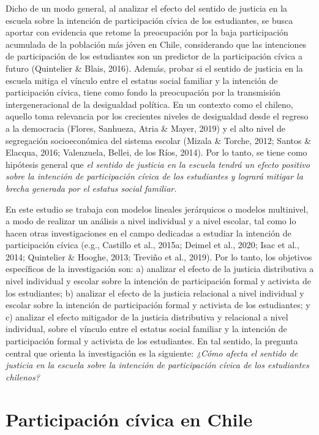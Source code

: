 \documentclass[12pt,twoside]{templates/facsothesis}
\begin{document}
Dicho de un modo general, al analizar el efecto del sentido de justicia en la escuela sobre la intención de participación cívica de los estudiantes, se busca aportar con evidencia que retome la preocupación por la baja participación acumulada de la población más jóven en Chile, considerando que las intenciones de participación de los estudiantes son un predictor de la participación cívica a futuro (Quintelier \& Blais, 2016). Además, probar si el sentido de justicia en la escuela mitiga el vínculo entre el estatus social familiar y la intención de participación cívica, tiene como fondo la preocupación por la transmisión intergeneracional de la desigualdad política. En un contexto como el chileno, aquello toma relevancia por los crecientes niveles de desigualdad desde el regreso a la democracia (Flores, Sanhueza, Atria \& Mayer, 2019) y el alto nivel de segregación socioeconómica del sistema escolar (Mizala \& Torche, 2012; Santos \& Elacqua, 2016; Valenzuela, Bellei, de los Ríos, 2014). Por lo tanto, se tiene como hipótesis general que \emph{el sentido de justicia en la escuela tendrá un efecto positivo sobre la intención de participación cívica de los estudiantes y logrará mitigar la brecha generada por el estatus social familiar.}

En este estudio se trabaja con modelos lineales jerárquicos o modelos multinivel, a modo de realizar un análisis a nivel individual y a nivel escolar, tal como lo hacen otras investigaciones en el campo dedicadas a estudiar la intención de participación cívica (e.g., Castillo et al., 2015a; Deimel et al., 2020; Isac et al., 2014; Quintelier \& Hooghe, 2013; Treviño et al., 2019). Por lo tanto, los objetivos específicos de la investigación son: a) analizar el efecto de la justicia distributiva a nivel individual y escolar sobre la intención de participación formal y activista de los estudiantes; b) analizar el efecto de la justicia relacional a nivel individual y escolar sobre la intención de participación formal y activista de los estudiantes; y c) analizar el efecto mitigador de la justicia distributiva y relacional a nivel individual, sobre el vínculo entre el estatus social familiar y la intención de participación formal y activista de los estudiantes. En tal sentido, la pregunta central que orienta la investigación es la siguiente: \emph{¿Cómo afecta el sentido de justicia en la escuela sobre la intención de participación cívica de los estudiantes chilenos?}

\hypertarget{participaciuxf3n-cuxedvica-en-chile}{%
\chapter{Participación cívica en Chile}\label{participaciuxf3n-cuxedvica-en-chile}}
\end{document}
